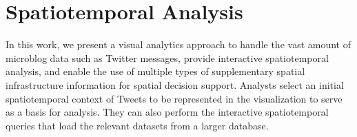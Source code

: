 \section{Spatiotemporal Analysis}
\label{sec:body}

In this work, we present a visual analytics approach to handle the vast amount of microblog data such as Twitter messages, provide interactive spatiotemporal analysis, and enable the use of multiple types of supplementary spatial infrastructure information for spatial decision support.
Analysts select an initial spatiotemporal context of Tweets to be represented in the visualization to serve as a basis for analysis. 
They can also perform the interactive spatiotemporal queries that load the relevant datasets from a larger database.





